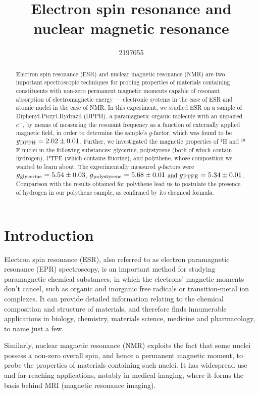 \documentclass[a4paper]{jpconf}
\numberwithin{equation}{section}
\begin{document}
\title{Electron spin resonance and nuclear magnetic resonance}
\author{2197055}

\begin{abstract}
Electron spin resonance (ESR) and nuclear magnetic resonance (NMR) are two important spectroscopic techniques for probing properties of materials containing constituents with non-zero permanent magnetic moments capable of resonant absorption of electromagnetic energy --- electronic systems in the case of ESR and atomic nuclei in the case of NMR. In this experiment, we studied ESR on a sample of Diphenyl-Picryl-Hydrazil (DPPH), a paramagnetic organic molecule with an unpaired $e^-$, by means of measuring the resonant frequency as a function of externally applied magnetic field, in order to determine the sample\textquoteright s $g$-factor, which was found to be $g\textsubscript{DPPH} = 2.02 \pm 0.01$.
Further, we investigated the magnetic properties of ${}^1$H and ${}^{19}$F nuclei in the following substances: glycerine, polystyrene (both of which contain hydrogen), PTFE (which contains fluorine), and polythene, whose composition we wanted to learn about. The experimentally measured $g$-factors were $g\textsubscript{glycerine} = 5.54 \pm 0.03$, $g\textsubscript{polystyrene} = 5.68 \pm 0.01$ and $g\textsubscript{PTFE} = 5.34 \pm 0.01$. Comparison with the results obtained for polythene lead us to postulate the presence of hydrogen in our polythene sample, as confirmed by its chemical formula.
\end{abstract}

\section{Introduction}
Electron spin resonance (ESR), also referred to as electron paramagnetic resonance (EPR) spectroscopy,      %
is an important method for studying paramagnetic chemical substances, in which the electrons' magnetic moments don't cancel, such as organic and inorganic free radicals or transition-metal ion complexes. It can provide detailed information relating to the chemical composition and structure of materials, and therefore finds innumerable applications in biology, chemistry, materials science, medicine and pharmacology, to name just a few.

Similarly, nuclear magnetic resonance (NMR) exploits the fact that some nuclei possess a non-zero overall spin, and hence a permanent magnetic moment, to probe the properties of materials containing such nuclei. It has widespread use and far-reaching applications, notably in medical imaging, where it forms the basis behind MRI (magnetic resonance imaging).
\end{document}
